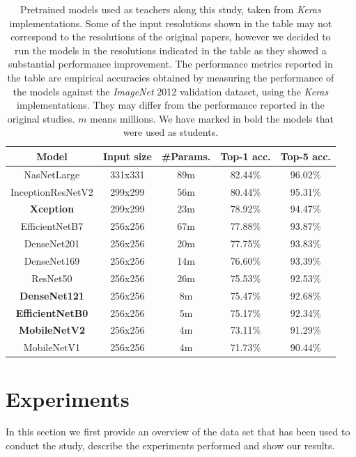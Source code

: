 \begin{table}[h]
	\small
	\caption{Pretrained models used as teachers along this study, taken from \textit{Keras} implementations. Some of the input resolutions shown in the table may not correspond to the resolutions of the original papers, however we decided to run the models in the resolutions indicated in the table as they showed a substantial performance improvement. The performance metrics reported in the table are empirical accuracies obtained by measuring the performance of the models against the \textit{ImageNet} 2012 validation dataset, using the \textit{Keras} implementations. They may differ from the performance reported in the original studies. $m$ means millions. We have marked in bold the models that were used as students.}
	\centering
\begin{tabular}{c|cc|cc}
	\toprule
	         Model          & Input size & \#Params. & Top-1 acc. & Top-5 acc. \\ \midrule
	      NasNetLarge       &  331x331   &    89m    &  82.44\%   &  96.02\%   \\
	   InceptionResNetV2    &  299x299   &    56m    &  80.44\%   &  95.31\%   \\
	   \textbf{Xception}    &  299x299   &    23m   &  78.92\%   &  94.47\%   \\
	    EfficientNetB7      &  256x256   &    67m   &  77.88\%   &  93.87\%   \\
	      DenseNet201       &  256x256   &    20m    &  77.75\%   &  93.83\%   \\
	      DenseNet169       &  256x256   &    14m    &  76.60\%   &  93.39\%   \\
	       ResNet50         &  256x256   &    26m   &  75.53\%   &  92.53\%   \\
	 \textbf{DenseNet121}   &  256x256   &    8m     &  75.47\%   &  92.68\%   \\
	\textbf{EfficientNetB0} &  256x256   &    5m     &  75.17\%   &  92.34\%   \\
	 \textbf{MobileNetV2}   &  256x256   &    4m     &  73.11\%   &  91.29\%   \\
	      MobileNetV1       &  256x256   &    4m    &  71.73\%   &  90.44\%   \\ \bottomrule
\end{tabular}
\label{table:models}
\end{table}

\section{Experiments} \label{sec:distillation_experiments}
In this section we first provide an overview of the data set that has been used to conduct the study, describe the experiments performed and show our results.


